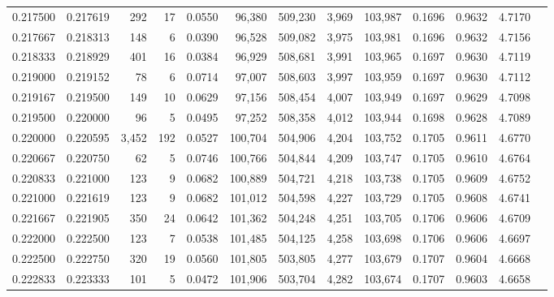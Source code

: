\begin{tabular}{rrrrrrrrrrrrr}
0.217500 & 0.217619 &   292 &  17 &                                     0.0550 &  96,380 & 509,230 &   3,969 & 103,987 & 0.1696 & 0.9632 & 4.7170 \\
0.217667 & 0.218313 &   148 &   6 &                                     0.0390 &  96,528 & 509,082 &   3,975 & 103,981 & 0.1696 & 0.9632 & 4.7156 \\
0.218333 & 0.218929 &   401 &  16 &                                     0.0384 &  96,929 & 508,681 &   3,991 & 103,965 & 0.1697 & 0.9630 & 4.7119 \\
0.219000 & 0.219152 &    78 &   6 &                                     0.0714 &  97,007 & 508,603 &   3,997 & 103,959 & 0.1697 & 0.9630 & 4.7112 \\
0.219167 & 0.219500 &   149 &  10 &                                     0.0629 &  97,156 & 508,454 &   4,007 & 103,949 & 0.1697 & 0.9629 & 4.7098 \\
0.219500 & 0.220000 &    96 &   5 &                                     0.0495 &  97,252 & 508,358 &   4,012 & 103,944 & 0.1698 & 0.9628 & 4.7089 \\
0.220000 & 0.220595 & 3,452 & 192 &                                     0.0527 & 100,704 & 504,906 &   4,204 & 103,752 & 0.1705 & 0.9611 & 4.6770 \\
0.220667 & 0.220750 &    62 &   5 &                                     0.0746 & 100,766 & 504,844 &   4,209 & 103,747 & 0.1705 & 0.9610 & 4.6764 \\
0.220833 & 0.221000 &   123 &   9 &                                     0.0682 & 100,889 & 504,721 &   4,218 & 103,738 & 0.1705 & 0.9609 & 4.6752 \\
0.221000 & 0.221619 &   123 &   9 &                                     0.0682 & 101,012 & 504,598 &   4,227 & 103,729 & 0.1705 & 0.9608 & 4.6741 \\
0.221667 & 0.221905 &   350 &  24 &                                     0.0642 & 101,362 & 504,248 &   4,251 & 103,705 & 0.1706 & 0.9606 & 4.6709 \\
0.222000 & 0.222500 &   123 &   7 &                                     0.0538 & 101,485 & 504,125 &   4,258 & 103,698 & 0.1706 & 0.9606 & 4.6697 \\
0.222500 & 0.222750 &   320 &  19 &                                     0.0560 & 101,805 & 503,805 &   4,277 & 103,679 & 0.1707 & 0.9604 & 4.6668 \\
0.222833 & 0.223333 &   101 &   5 &                                     0.0472 & 101,906 & 503,704 &   4,282 & 103,674 & 0.1707 & 0.9603 & 4.6658 \\

\end{tabular}
